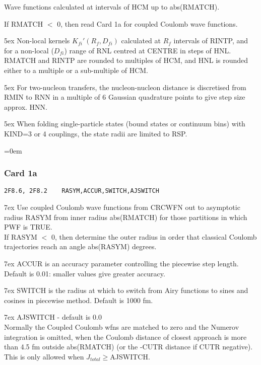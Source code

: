 \documentclass[11pt]{article}
\begin{document}
Wave functions calculated at intervals of HCM up to abs(RMATCH).

If RMATCH $<$ 0, then read Card 1a for  coupled Coulomb wave functions.

\hangindent 5ex
Non-local kernels $K_{fi}'(R_{f},D_{fi})$ calculated at $R_f$ intervals of RINTP,
and for a non-local ($D_{fi}$) range of RNL centred at CENTRE in steps of HNL.
RMATCH and RINTP are rounded to multiples of HCM, and HNL is rounded either to
a multiple or a sub-multiple of HCM.

\hangindent 5ex
For two-nucleon transfers, the nucleon-nucleon distance is
discretised from RMIN to RNN in a multiple of 6 Gaussian quadrature
points to give step size approx. HNN.

\hangindent 5ex
When folding single-particle states (bound states or continuum bins) with
KIND=3 or 4 couplings, the state radii are limited to RSP.
\bigskip

\leftskip=0em
%
\subsubsection*{Card 1a}
\begin{verbatim}
2F8.6, 2F8.2    RASYM,ACCUR,SWITCH,AJSWITCH
\end{verbatim}


\hangindent 7ex
Use coupled Coulomb wave functions from CRCWFN out to asymptotic radius RASYM from
inner radius abs(RMATCH) for those partitions in which PWF is TRUE.
\\
If RASYM $<$ 0, then determine the outer radius in order that classical
Coulomb trajectories reach an angle abs(RASYM) degrees.

\hangindent 7ex
ACCUR is an accuracy parameter controlling the piecewise step length.
Default is 0.01: smaller values give greater accuracy.

\hangindent 7ex
SWITCH is the radius at which to switch from Airy functions
to sines and cosines in piecewise method.  Default is 1000 fm.

\hangindent 7ex
AJSWITCH - default is 0.0
\\
Normally the Coupled Coulomb wfns are matched to zero
and the Numerov integration is omitted,
when the Coulomb distance of closest approach is more than 4.5 fm outside
abs(RMATCH) (or  the  -CUTR distance if   CUTR negative).
This is only allowed when $J_{total} \geq $AJSWITCH.
\bigskip
\end{document}
